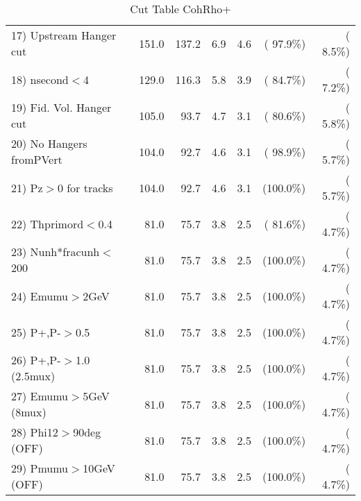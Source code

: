 \begin{table}[h!]
\begin{tabular}{||l||r|r|r|r|r|r||}
 17) Upstream Hanger cut  &        151.0 &        137.2 &          6.9 &          4.6 & ( 97.9\%) & (  8.5\%) \\
 18) nsecond$<$4          &        129.0 &        116.3 &          5.8 &          3.9 & ( 84.7\%) & (  7.2\%) \\
 19) Fid. Vol. Hanger cut &        105.0 &         93.7 &          4.7 &          3.1 & ( 80.6\%) & (  5.8\%) \\
 20) No Hangers fromPVert &        104.0 &         92.7 &          4.6 &          3.1 & ( 98.9\%) & (  5.7\%) \\
 21) Pz$>$0 for tracks    &        104.0 &         92.7 &          4.6 &          3.1 & (100.0\%) & (  5.7\%) \\
 22) Thprimord$<$0.4      &         81.0 &         75.7 &          3.8 &          2.5 & ( 81.6\%) & (  4.7\%) \\
 23) Nunh*fracunh$<$200   &         81.0 &         75.7 &          3.8 &          2.5 & (100.0\%) & (  4.7\%) \\
 24) Emumu$>$2GeV         &         81.0 &         75.7 &          3.8 &          2.5 & (100.0\%) & (  4.7\%) \\
 25) P+,P-$>$0.5          &         81.0 &         75.7 &          3.8 &          2.5 & (100.0\%) & (  4.7\%) \\
 26) P+,P-$>$1.0 (2.5mux) &         81.0 &         75.7 &          3.8 &          2.5 & (100.0\%) & (  4.7\%) \\
 27) Emumu$>$5GeV  (8mux) &         81.0 &         75.7 &          3.8 &          2.5 & (100.0\%) & (  4.7\%) \\
 28) Phi12$>$90deg  (OFF) &         81.0 &         75.7 &          3.8 &          2.5 & (100.0\%) & (  4.7\%) \\
 29) Pmumu$>$10GeV  (OFF) &         81.0 &         75.7 &          3.8 &          2.5 & (100.0\%) & (  4.7\%) \\
 \hline
 \hline
 \end{tabular}
 \caption{Cut Table  CohRho+  }
 \label{tab-cutcohjpsi-mumu_cohrhop}
 \end{table}
